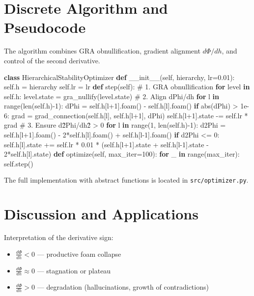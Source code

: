 \documentclass[11pt,a4paper]{article}
\begin{document}
\section{Discrete Algorithm and Pseudocode}

The algorithm combines GRA obnullification, gradient alignment $d\Phi/dh$, and control of the second derivative.

\begin{algorithm}[H]
\caption{HierarchicalStabilityOptimizer}
\begin{algorithmic}[1]
\State \textbf{class} HierarchicalStabilityOptimizer
\State \quad \textbf{def} \_\_init\_\_(self, hierarchy, lr=0.01):
\State \quad \quad self.h = hierarchy 
\State \quad \quad self.lr = lr
\State \quad \textbf{def} step(self):
\State \quad \quad \# 1. GRA obnullification
\State \quad \quad \textbf{for} level \textbf{in} self.h: level.state = gra\_nullify(level.state)
\State \quad \quad \# 2. Align dPhi/dh
\State \quad \quad \textbf{for} l \textbf{in} range(len(self.h)-1):
\State \quad \quad \quad dPhi = self.h[l+1].foam() - self.h[l].foam()
\State \quad \quad \quad \textbf{if} abs(dPhi) > 1e-6:
\State \quad \quad \quad \quad grad = grad\_connection(self.h[l], self.h[l+1], dPhi)
\State \quad \quad \quad \quad self.h[l+1].state -= self.lr * grad
\State \quad \quad \# 3. Ensure d\^2Phi/dh\^2 > 0
\State \quad \quad \textbf{for} l \textbf{in} range(1, len(self.h)-1):
\State \quad \quad \quad d2Phi = self.h[l+1].foam() - 2*self.h[l].foam() + self.h[l-1].foam()
\State \quad \quad \quad \textbf{if} d2Phi <= 0:
\State \quad \quad \quad \quad self.h[l].state += self.lr * 0.01 * (self.h[l+1].state + self.h[l-1].state - 2*self.h[l].state)
\State \quad \textbf{def} optimize(self, max\_iter=100):
\State \quad \quad \textbf{for} \_ \textbf{in} range(max\_iter): self.step()
\end{algorithmic}
\end{algorithm}

The full implementation with abstract functions is located in \texttt{src/optimizer.py}.

\section{Discussion and Applications}

Interpretation of the derivative sign:
\begin{itemize}
    \item $\frac{d\Phi}{dh} < 0$ --- productive foam collapse
    \item $\frac{d\Phi}{dh} \approx 0$ --- stagnation or plateau
    \item $\frac{d\Phi}{dh} > 0$ --- degradation (hallucinations, growth of contradictions)
\end{itemize}
\end{document}
